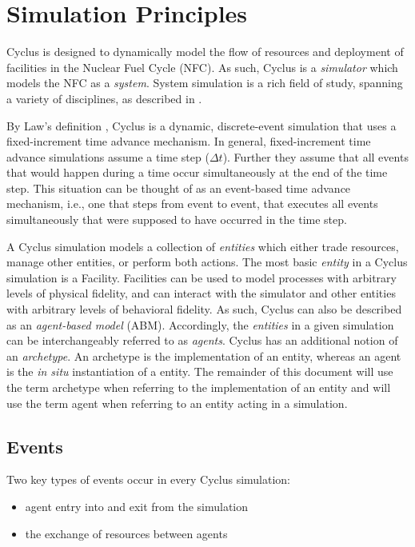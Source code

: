 
\section{Simulation Principles}\label{abm:sim}

Cyclus is designed to dynamically model the flow of resources and deployment of
facilities in the Nuclear Fuel Cycle (NFC). As such, Cyclus is a
\textit{simulator} which models the NFC as a \textit{system}. System simulation
is a rich field of study, spanning a variety of disciplines, as described in
.

By Law's definition \cite{Law:1999:SMA:554952}, Cyclus is a dynamic,
discrete-event simulation that uses a fixed-increment time advance mechanism. In
general, fixed-increment time advance simulations assume a time step ($\Delta
t$). Further they assume that all events that would happen during a time occur
simultaneously at the end of the time step. This situation can be thought of as
an event-based time advance mechanism, i.e., one that steps from event to event,
that executes all events simultaneously that were supposed to have occurred in
the time step.

A Cyclus simulation models a collection of \textit{entities} which either trade
resources, manage other entities, or perform both actions. The most basic
\textit{entity} in a Cyclus simulation is a Facility. Facilities can be used to
model processes with arbitrary levels of physical fidelity, and can interact
with the simulator and other entities with arbitrary levels of behavioral
fidelity. As such, Cyclus can also be described as an \textit{agent-based model}
(ABM). Accordingly, the \textit{entities} in a given simulation can be
interchangeably referred to as \textit{agents}. Cyclus has an additional notion
of an \textit{archetype}. An archetype is the implementation of an entity,
whereas an agent is the \textit{in situ} instantiation of a entity. The
remainder of this document will use the term archetype when referring to the
implementation of an entity and will use the term agent when referring to an
entity acting in a simulation.

\subsection{Events}

Two key types of events occur in every Cyclus simulation:

\begin{itemize}
\item agent entry into and exit from the simulation
\item the exchange of resources between agents
\end{itemize}

